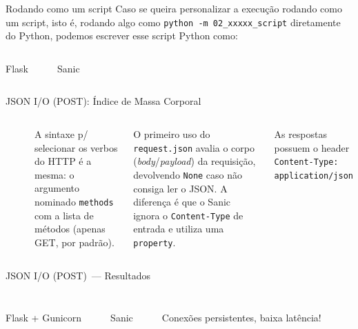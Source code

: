 \documentclass[utf8]{beamer}
\begin{document}
\begin{frame}[fragile]{Rodando como um script}
  Caso se queira personalizar a execução rodando como um script,
  isto é, rodando algo como
  \texttt{python -m 02_xxxxx_script}
  diretamente do Python,
  podemos escrever esse script Python como:
  \vfill
  \begin{columns}[t]
    Flask\inputminted{python}{02_flask_script.py}
    Sanic\inputminted{python}{02_sanic_script.py}
  \end{columns}
\end{frame}


\begin{frame}[fragile]{JSON I/O (POST): Índice de Massa Corporal}
  \begin{columns}
    \inputminted{python}{03_flask_json.py}
    \vfill
    \inputminted{python}{03_sanic_json.py}

    \fontsize{.8em}{1.2em}\selectfont
    A sintaxe p/ selecionar os verbos do HTTP é a mesma:
    o argumento nominado \texttt{methods}
    com a lista de métodos (apenas GET, por padrão).

    \vspace{1em}
    O primeiro uso do \texttt{request.json}
    avalia o corpo (\emph{body}/\emph{payload}) da requisição,
    devolvendo \texttt{None} caso não consiga ler o JSON.
    A diferença é que o Sanic ignora o \texttt{Content-Type} de
    entrada e utiliza uma \texttt{property}.

    \vspace{1em}
    As respostas possuem o header
    \texttt{Content-Type: application/json}
  \end{columns}
\end{frame}


\begin{frame}[fragile]{JSON I/O (POST)~--- Resultados}
  \inputminted{python}{03_curl.txt}
  \vfill
  \begin{columns}
    Flask + Gunicorn
    \inputminted{raw}{03_flask_headers.txt}

    Sanic
    \inputminted{raw}{03_sanic_headers.txt}
    Conexões persistentes, baixa latência!
  \end{columns}
\end{frame}
\end{document}

